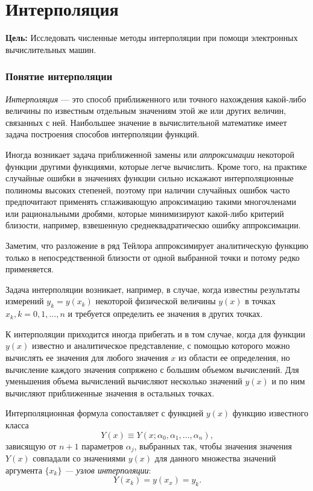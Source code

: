 \section{Интерполяция}

\noindent \textbf{Цель:} Исследовать численные методы интерполяции
при помощи электронных вычислительных машин.

\medskip{}



\subsubsection{Понятие интерполяции}

\emph{Интерполяция} --- это способ приближенного или точного нахождения
какой-либо величины по известным отдельным значениям этой же или других
величин, связанных с ней. Наибольшее значение в вычислительной математике
имеет задача построения способов интерполяции функций.

Иногда возникает задача приближенной замены или \emph{аппроксимации}\emph{
}некоторой функции другими функциями, которые легче вычислить. Кроме
того, на практике случайные ошибки в значениях функции сильно искажают
интерполяционные полиномы высоких степеней, поэтому при наличии случайных
ошибок часто предпочитают применять сглаживающую апроксимацию такими
многочленами или рациональными дробями, которые минимизируют какой-либо
критерий близости, например, взвешенную среднеквадратическю ошибку
аппроксимации.

Заметим, что разложение в ряд Тейлора аппроксимирует аналитическую
функцию только в непосредственной близости от одной выбранной точки
и потому редко применяется.

Задача интерполяции возникает, например, в случае, когда известны
результаты измерений $y_{k}=y(x_{k})$ некоторой физической величины
$y(x)$ в точках $x_{k},k=0,1,\dots,n$ и требуется определить ее
значения в других точках. 

К интерполяции приходится иногда прибегать и в том случае, когда для
функции $y(x)$ известно и аналитическое представление, с помощью
которого можно вычислять ее значения для любого значения $x$ из области
ее определения, но вычисление каждого значения сопряжено с большим
объемом вычислений. Для уменьшения объема вычислений вычисляют несколько
значений $y(x)$ и по ним вычисляют приближенные значения в остальных
точках.

Интерполяционная формула сопоставляет с функцией $y(x)$ функцию известного
класса 
\[
Y(x)\equiv Y(x;\alpha_{0},\alpha_{1},\dots,\alpha_{n}),
\]
зависящую от $n+1$ параметров $\alpha_{j}$, выбранных так, чтобы
значения значения $Y(x)$ совпадали со значениями $y(x)$ для данного
множества значений аргумента $\{x_{k}\}$ \emph{--- узлов интерполяции}:
\[
Y(x_{k})=y(x_{x})=y_{k}.
\]


